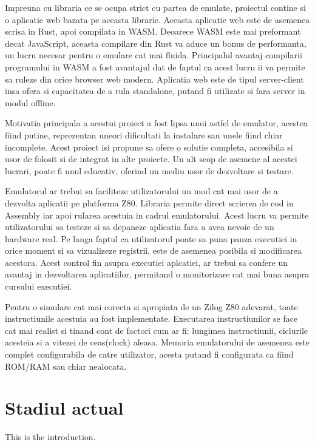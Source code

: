 \documentclass[titlepage,12pt]{article}
\begin{document}
Impreuna cu libraria ce se ocupa strict cu partea de emulate, proiectul contine si o aplicatie web bazata pe aceasta librarie.
Aceasta aplicatie web este de asemenea scrisa in Rust, apoi compilata in \ac {WASM}. Deoarece \ac {WASM} este mai preformant decat JavaScript, aceasta compilare din Rust va aduce un bonus de performanta, un lucru necesar pentru o emulare cat mai fluida.
Principalul avantaj compilarii programului in \ac {WASM} a fost avantajul dat de faptul ca acest lucru ii va permite sa ruleze din orice browser web modern.
Aplicatia web este de tipul server-client insa ofera si capacitatea de a rula standalone, putand fi utilizate si fara server in modul offline.

Motivatia principala a acestui proiect a fost lipsa unui astfel de emulator, acestea fiind putine, reprezentan uneori dificultati la instalare sau unele fiind chiar incomplete.
Acest proiect isi propune sa ofere o solutie completa, accesibila si usor de folosit si de integrat in alte proiecte. Un alt scop de asemene al acestei lucrari, poate fi unul educativ, oferind un mediu usor de dezvoltare si testare.

Emulatorul ar trebui sa faciliteze utilizatorului un mod cat mai usor de a dezvolta aplicatii pe platforma Z80.
Libraria permite direct scrierea de cod in Assembly iar apoi rularea acestuia in cadrul emulatorului. Acest lucru va permite utilizatorului sa testeze si sa depaneze aplicatia fara a avea nevoie de un hardware real.
Pe langa faptul ca utilizatorul poate sa puna pauza executiei in orice moment si sa vizualizeze registrii, este de asemenea posibila si modificarea acestora.
Acest control fin asupra executiei aplcatiei, ar trebui sa confere un avantaj in dezvoltarea aplicatiilor, permitand o monitorizare cat mai buna asupra cursului executiei.

Pentru o simulare cat mai corecta si apropiata de un Zilog Z80 adevarat, toate instructiunile acestuia au fost implementate. 
Executarea instructiunilor se face cat mai realist si tinand cont de factori cum ar fi: lungimea instructiunii, ciclurile acesteia si a vitezei de ceas(clock) aleasa.
Memoria emulatorului de asemenea este complet configurabila de catre utilizator, acesta putand fi configurata ca fiind \ac {ROM}/\ac {RAM} sau chiar nealocata.


\section{Stadiul actual}
This is the introduction.
\end{document}
